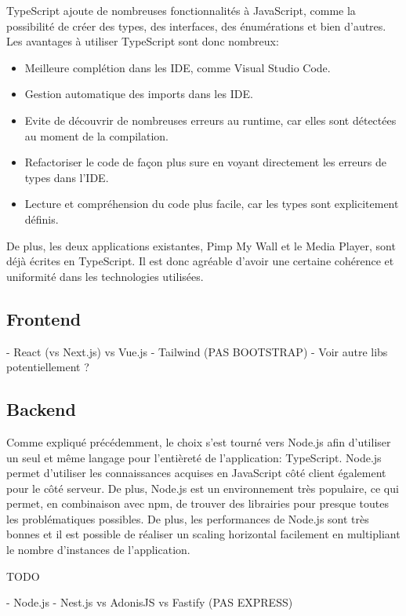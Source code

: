 TypeScript ajoute de nombreuses fonctionnalités à JavaScript, comme la possibilité de créer des types, des interfaces, des énumérations et bien d'autres. Les avantages à utiliser TypeScript sont donc nombreux:

\begin{itemize}
  \item Meilleure complétion dans les IDE, comme Visual Studio Code.
  \item Gestion automatique des imports dans les IDE.
  \item Evite de découvrir de nombreuses erreurs au runtime, car elles sont détectées au moment de la compilation.
  \item Refactoriser le code de façon plus sure en voyant directement les erreurs de types dans l'IDE.
  \item Lecture et compréhension du code plus facile, car les types sont explicitement définis.
\end{itemize}

De plus, les deux applications existantes, Pimp My Wall et le Media Player, sont déjà écrites en TypeScript. Il est donc agréable d'avoir une certaine cohérence et uniformité dans les technologies utilisées.

\subsection{Frontend}

- React (vs Next.js) vs Vue.js
- Tailwind (PAS BOOTSTRAP)
- Voir autre libs potentiellement ?

\subsection{Backend}

Comme expliqué précédemment, le choix s'est tourné vers Node.js \cite{nodejs} afin d'utiliser un seul et même langage pour l'entièreté de l'application: TypeScript. Node.js permet d'utiliser les connaissances acquises en JavaScript côté client également pour le côté serveur. De plus, Node.js est un environnement très populaire, ce qui permet, en combinaison avec \Gls{npm}, de trouver des librairies pour presque toutes les problématiques possibles. De plus, les performances de Node.js sont très bonnes et il est possible de réaliser un scaling horizontal facilement en multipliant le nombre d'instances de l'application.

TODO

- Node.js
- Nest.js vs AdonisJS vs Fastify (PAS EXPRESS)

